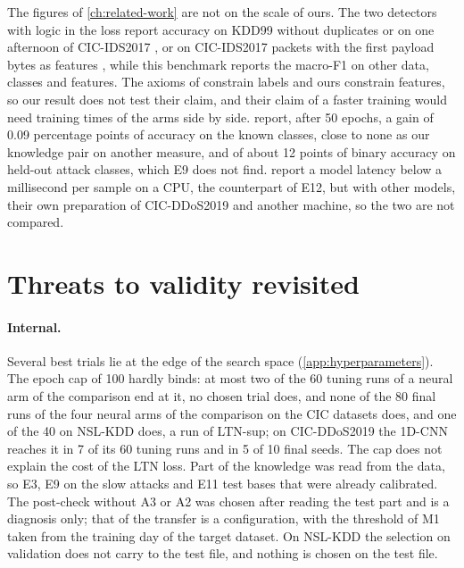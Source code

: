 The figures of \cref{ch:related-work} are not on the scale of ours. The two detectors with logic in the loss report
accuracy on KDD99 without duplicates or on one afternoon of CIC-IDS2017 \citep{onchis2022neurosymbolic}, or on CIC-IDS2017
packets with the first payload bytes as features \citep{bizzarri2024nsaids}, while this benchmark reports the macro-F1 on
other data, classes and features. The axioms of \citet{onchis2022neurosymbolic} constrain labels and ours constrain
features, so our result does not test their claim, and their claim of a faster training would need training times of the
arms side by side. \citet{bizzarri2024nsaids} report, after 50 epochs, a gain of 0.09 percentage points of accuracy on the known
classes, close to none as our knowledge pair on another measure, and of about 12 points of binary accuracy on held-out
attack classes, which E9 does not find. \citet{alemayehu2026deployment} report a model latency below a millisecond per
sample on a CPU, the counterpart of E12, but with other models, their own preparation of CIC-DDoS2019 and another
machine, so the two are not compared.

\section{Threats to validity revisited}
\label{sec:res-threats}

\paragraph{Internal.}
Several best trials lie at the edge of the search space (\cref{app:hyperparameters}). The epoch cap of 100 hardly
binds: at most two of the 60 tuning runs of a neural arm of the comparison end at it, no chosen trial does, and none of the 80 final runs of the
four neural arms of the comparison on the CIC datasets does, and one of the 40 on NSL-KDD does, a run of LTN-sup; on
CIC-DDoS2019 the 1D-CNN reaches it in 7 of its 60 tuning runs and in 5 of 10 final seeds.
The cap does not explain the cost of the LTN loss. Part of the knowledge was read from the data, so E3, E9 on the slow
attacks and E11 test bases that were already calibrated. The post-check without A3 or A2 was chosen after reading the test
part and is a diagnosis only; that of the transfer is a configuration, with the threshold of M1 taken from the training
day of the target dataset. On NSL-KDD the selection on validation does not carry to the test file, and nothing is chosen
on the test file.

